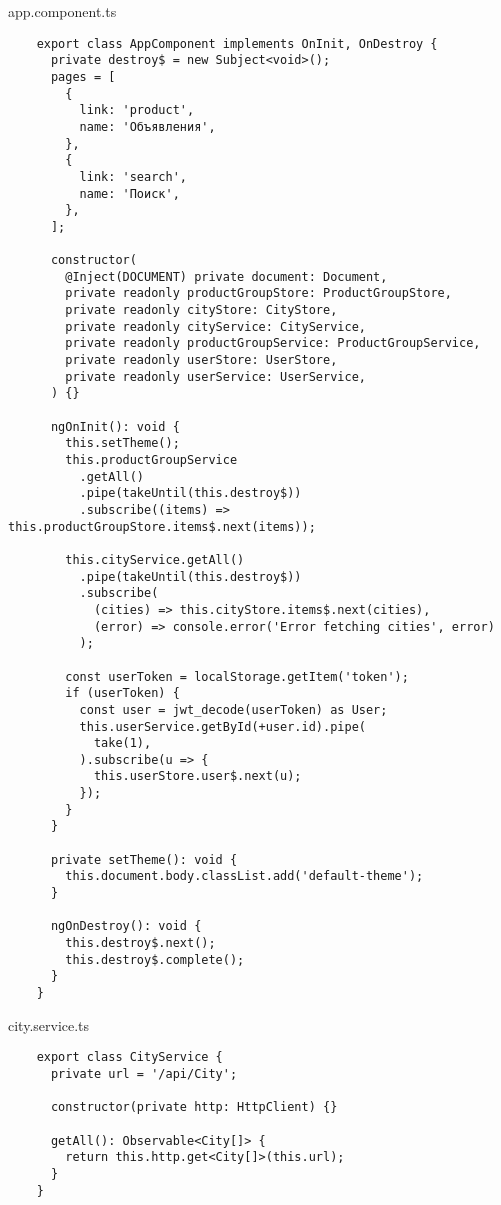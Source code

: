 app.component.ts
\begin{lstlisting}
    export class AppComponent implements OnInit, OnDestroy {
      private destroy$ = new Subject<void>();
      pages = [
        {
          link: 'product',
          name: 'Объявления',
        },
        {
          link: 'search',
          name: 'Поиск',
        },
      ];
    
      constructor(
        @Inject(DOCUMENT) private document: Document,
        private readonly productGroupStore: ProductGroupStore,
        private readonly cityStore: CityStore,
        private readonly cityService: CityService,
        private readonly productGroupService: ProductGroupService,
        private readonly userStore: UserStore,
        private readonly userService: UserService,
      ) {}
    
      ngOnInit(): void {
        this.setTheme();
        this.productGroupService
          .getAll()
          .pipe(takeUntil(this.destroy$))
          .subscribe((items) => this.productGroupStore.items$.next(items));
    
        this.cityService.getAll()
          .pipe(takeUntil(this.destroy$))
          .subscribe(
            (cities) => this.cityStore.items$.next(cities),
            (error) => console.error('Error fetching cities', error)
          );
    
        const userToken = localStorage.getItem('token');
        if (userToken) {
          const user = jwt_decode(userToken) as User;
          this.userService.getById(+user.id).pipe(
            take(1),
          ).subscribe(u => {
            this.userStore.user$.next(u);
          });
        }
      }
    
      private setTheme(): void {
        this.document.body.classList.add('default-theme');
      }
    
      ngOnDestroy(): void {
        this.destroy$.next();
        this.destroy$.complete();
      }
    }    
\end{lstlisting}

city.service.ts
\begin{lstlisting}
    export class CityService {
      private url = '/api/City';
    
      constructor(private http: HttpClient) {}
    
      getAll(): Observable<City[]> {
        return this.http.get<City[]>(this.url);
      }
    }
\end{lstlisting}

